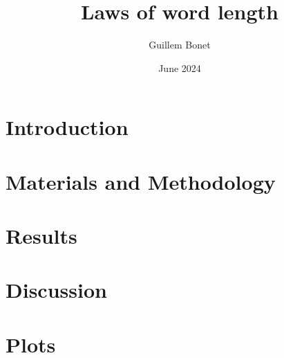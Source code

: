 \documentclass{article}
\title{Laws of word length}
\author{Guillem Bonet}
\date{June 2024}
\begin{document}
  \maketitle
  \section{Introduction}
    
  \section{Materials and Methodology}
   
  \section{Results}
   
  \section{Discussion}
    


\nocite{*}
\newpage


\newpage
\appendix
\section{Plots}
\label{sec:annex}

\end{document}
